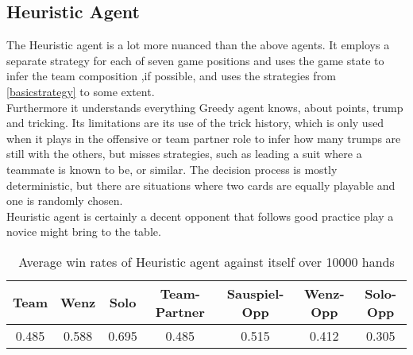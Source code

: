 \subsection{Heuristic Agent}
The Heuristic agent is a lot more nuanced than the above agents.
It employs a separate strategy for each of seven game positions and uses the game state to infer the team composition
,if possible, and uses the strategies from \ref{basicstrategy} to some extent.\\
Furthermore it understands everything Greedy agent knows, about points, trump and tricking.
Its limitations are its use of the trick history, which is only used when it plays in the offensive or team partner
role to infer how many trumps are still with the others, but misses strategies, such as leading a suit where a
teammate is known to be, or similar.
The decision process is mostly deterministic, but there are situations where two cards are equally playable and one is
randomly chosen.\\
Heuristic agent is certainly a decent opponent that follows good practice play a novice might bring to the table.
\begin{table}[!h]
    \centering
    \begin{tabular}{ccccccc}
        \toprule
        Team  & Wenz  & Solo  & Team-Partner & Sauspiel-Opp & Wenz-Opp & Solo-Opp \\
        \midrule
        0.485 & 0.588 & 0.695 & 0.485        & 0.515        & 0.412    & 0.305    \\
        \bottomrule
    \end{tabular}
    \caption{Average win rates of Heuristic agent against itself over 10000 hands}
    \label{tab:win ratesHeu}
\end{table}